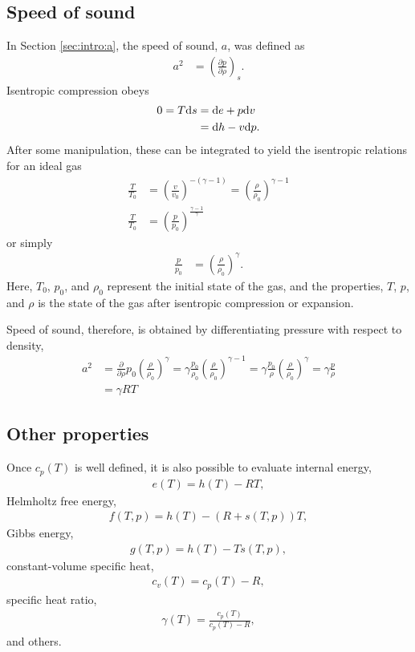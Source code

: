 \subsection{Speed of sound}

In Section \ref{sec:intro:a}, the speed of sound, $a$, was defined as
\begin{align}
a^2 &= \left( \frac{\partial p}{\partial \rho} \right)_s.
\end{align}
Isentropic compression obeys
\begin{align*}
0 = T \mathrm{d} s &= \mathrm{d} e + p \mathrm{d} v\\
 &= \mathrm{d} h - v \mathrm{d} p.
\end{align*}
After some manipulation, these can be integrated to yield the isentropic relations for an ideal gas
\begin{align}
\frac{T}{T_0} &= \left(\frac{v}{v_0}\right)^{-(\gamma-1)} = \left(\frac{\rho}{\rho_0}\right)^{\gamma-1}\nonumber\\
\frac{T}{T_0} &= \left(\frac{p}{p_0}\right)^{\frac{\gamma-1}{\gamma}}\nonumber
\end{align}
or simply
\begin{align}
\frac{p}{p_0} &= \left(\frac{\rho}{\rho_0}\right)^{\gamma}.
\end{align}
Here, $T_0$, $p_0$, and $\rho_0$ represent the initial state of the gas, and the properties, $T$, $p$, and $\rho$ is the state of the gas after isentropic compression or expansion.

Speed of sound, therefore, is obtained by differentiating pressure with respect to density,
\begin{align}
a^2 &= \frac{\partial}{\partial \rho} p_0 \left(\frac{\rho}{\rho_0}\right)^\gamma 
  = \gamma \frac{p_0}{\rho_0} \left(\frac{\rho}{\rho_0}\right)^{\gamma-1}
  = \gamma \frac{p_0}{\rho} \left(\frac{\rho}{\rho_0}\right)^{\gamma}
  = \gamma \frac{p}{\rho}\nonumber\\
  &= \gamma R T
\end{align}


\subsection{Other properties}

Once $c_p(T)$ is well defined, it is also possible to evaluate internal energy,
\begin{align}
e(T) = h(T) - RT,\label{eqn:ig:e}
\end{align}
Helmholtz free energy,
\begin{align}
f(T,p) = h(T) - (R+s(T,p))T,\label{eqn:ig:f}
\end{align}
Gibbs energy,
\begin{align}
g(T,p) = h(T) - T s(T,p),\label{eqn:ig:g}
\end{align}
constant-volume specific heat,
\begin{align}
c_v(T) = c_p(T) - R,\label{eqn:ig:cv}
\end{align}
specific heat ratio,
\begin{align}
\gamma(T) = \frac{c_p(T)}{c_p(T) - R},\label{eqn:ig:gam}
\end{align}
and others.

